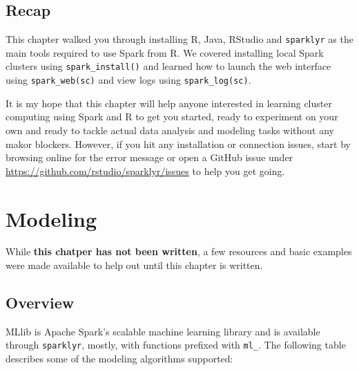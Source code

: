 \documentclass[]{book}
\theoremstyle{definition}
\theoremstyle{definition}
\theoremstyle{definition}
\theoremstyle{remark}
\begin{document}
\hypertarget{recap}{%
\section{Recap}\label{recap}}

This chapter walked you through installing R, Java, RStudio and
\texttt{sparklyr} as the main tools required to use Spark from R. We
covered installing local Spark clusters using \texttt{spark\_install()}
and learned how to launch the web interface using
\texttt{spark\_web(sc)} and view logs using \texttt{spark\_log(sc)}.

It is my hope that this chapter will help anyone interested in learning
cluster computing using Spark and R to get you started, ready to
experiment on your own and ready to tackle actual data analysis and
modeling tasks without any makor blockers. However, if you hit any
installation or connection issues, start by browsing online for the
error message or open a GitHub issue under
\url{https://github.com/rstudio/sparklyr/issues} to help you get going.

\hypertarget{modeling}{%
\chapter{Modeling}\label{modeling}}

While \textbf{this chatper has not been written}, a few resources and
basic examples were made available to help out until this chapter is
written.

\hypertarget{overview}{%
\section{Overview}\label{overview}}

MLlib is Apache Spark's scalable machine learning library and is
available through \texttt{sparklyr}, mostly, with functions prefixed
with \texttt{ml\_}. The following table describes some of the modeling
algorithms supported:
\end{document}
